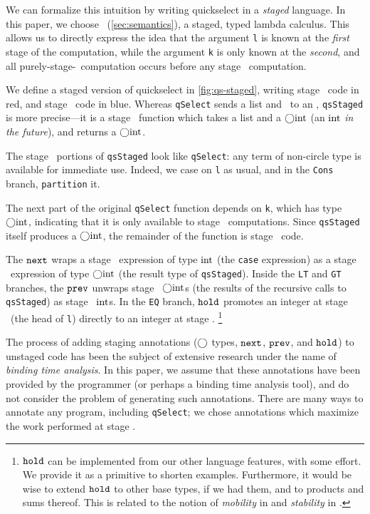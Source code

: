We can formalize this intuition by writing quickselect in a \emph{staged}
language. In this paper, we choose \lang\ (\ref{sec:semantics}), a staged, typed
lambda calculus. This allows us to directly express the idea that the argument
\texttt{l} is known at the \emph{first} stage of the computation, while the
argument \texttt{k} is only known at the \emph{second}, and all
purely-stage-\bbone\ computation occurs before any stage \bbtwo\ computation.

We define a staged version of quickselect in \ref{fig:qs-staged}, writing stage
\bbone\ code in red, and stage \bbtwo\ code in blue. Whereas \texttt{qSelect}
sends a \textrm{list} and \rmint\ to an \rmint, \texttt{qsStaged} is more
precise---it is a stage \bbone\ function which takes a \textrm{list} and a
$\bigcirc{\rm int}$ (an ${\rm int}$ \emph{in the future}), and returns a $\bigcirc{\rm int}$. 

The stage \bbone\ portions of \texttt{qsStaged} look like \texttt{qSelect}: any
term of non-circle type is available for immediate use. Indeed, we case on
\texttt{l} as usual, and in the \texttt{Cons} branch, \texttt{partition} it.

The next part of the original \texttt{qSelect} function depends on \texttt{k},
which has type $\bigcirc{\rm int}$, indicating that it is only available to stage
\bbtwo\ computations. Since \texttt{qsStaged} itself produces a $\bigcirc{\rm int}$,
the remainder of the function is stage \bbtwo\ code.

The ${\tt next}$ wraps a stage \bbtwo\ expression of type ${\rm int}$ (the \texttt{case}
expression) as a stage \bbone\ expression of type $\bigcirc{\rm int}$ (the result type
of \texttt{qsStaged}). Inside the \texttt{LT} and \texttt{GT} branches, the
${\tt prev}$ unwraps stage \bbone\ $\bigcirc{\rm int}$s (the results of the recursive calls
to \texttt{qsStaged}) as stage \bbtwo\ ${\rm int}$s. In the \texttt{EQ} branch,
${\tt hold}$ promotes an integer at stage \bbone\ (the head of \texttt{l}) directly
to an integer at stage \bbtwo.%
\footnote{${\tt hold}$ can be implemented from our other language features, with
some effort. We provide it as a primitive to shorten examples. Furthermore, it
would be wise to extend ${\tt hold}$ to other base types, if we had them, and to
products and sums thereof.  This is related to the notion of {\em mobility} in
\cite{murphy05} and {\em stability} in \cite{krishnaswami13}.}

The process of adding staging annotations ($\bigcirc$ types, ${\tt next}$, ${\tt prev}$, and
${\tt hold}$) to unstaged code has been the subject of extensive research under the
name of \emph{binding time analysis}. In this paper, we assume that these
annotations have been provided by the programmer (or perhaps a binding time
analysis tool), and do not consider the problem of generating such annotations.
There are many ways to annotate any program, including \texttt{qSelect}; we
chose annotations which maximize the work performed at stage \bbone.

